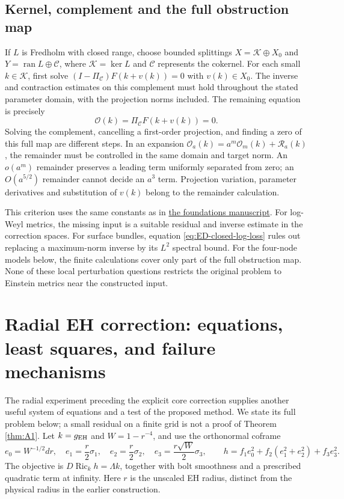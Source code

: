 \documentclass[a4paper,11pt]{article}
\numberwithin{equation}{section}
\theoremstyle{definition}
\newcommand{\Ric}{\operatorname{Ric}}
\begin{document}
\subsection{Kernel, complement and the full obstruction map}\label{sec:construction-obstruction}
If $L$ is Fredholm with closed range, choose bounded splittings
$X=\mathcal K\oplus X_0$ and
$Y=\operatorname{ran}L\oplus\mathcal C$, where $\mathcal K=\ker L$ and
$\mathcal C$ represents the cokernel.
For each small $k\in\mathcal K$, first solve
$(I-\Pi_{\mathcal C})F(k+v(k))=0$ with $v(k)\in X_0$.
The inverse and contraction estimates on this complement must hold throughout
the stated parameter domain, with the projection norms included.
The remaining equation is precisely
\begin{equation}\label{eq:construction-full-obstruction}
\mathcal O(k)=\Pi_{\mathcal C}F(k+v(k))=0.
\end{equation}
Solving the complement, cancelling a first-order projection, and finding a
zero of this full map are different steps.
In an expansion
$\mathcal O_a(k)=a^m\mathcal O_m(k)+\mathcal R_a(k)$,
the remainder must be controlled in the same domain and target norm.
An $o(a^m)$ remainder preserves a leading term uniformly separated from zero;
an $O(a^{5/2})$ remainder cannot decide an $a^3$ term.
Projection variation, parameter derivatives and substitution of $v(k)$
belong to the remainder calculation.

This criterion uses the same constants as
 in \href{20260910.tex}{the foundations manuscript}.
For log-Weyl metrics, the missing input is a suitable residual and inverse
estimate in the correction spaces. For surface bundles,
equation \eqref{eq:ED-closed-log-loss} rules out replacing a maximum-norm
inverse by its $L^2$ spectral bound. For the four-node models below, the
finite calculations cover only part of the full obstruction map.
None of these local perturbation questions restricts the original problem
to Einstein metrics near the constructed input.

\section{Radial EH correction: equations, least squares, and failure mechanisms}\label{sec:eh-ls}
The radial experiment preceding the explicit core correction supplies another useful system of equations and a test of the proposed method.
We state its full problem below; a small residual on a finite grid is not a proof of Theorem \ref{thm:A1}.
Let $k=g_{\rm EH}$ and $W=1-r^{-4}$, and use the orthonormal coframe
\[
e_0=W^{-1/2}dr,\quad e_1=\frac r2\sigma_1,\quad
e_2=\frac r2\sigma_2,\quad e_3=\frac{r\sqrt W}{2}\sigma_3,
\qquad
h=f_1e_0^2+f_2(e_1^2+e_2^2)+f_3e_3^2.
\]
The objective is $D\Ric_kh=\Lambda k$, together with bolt smoothness and a prescribed quadratic term at infinity.
Here $r$ is the unscaled EH radius, distinct from the physical radius in the earlier construction.
\end{document}
